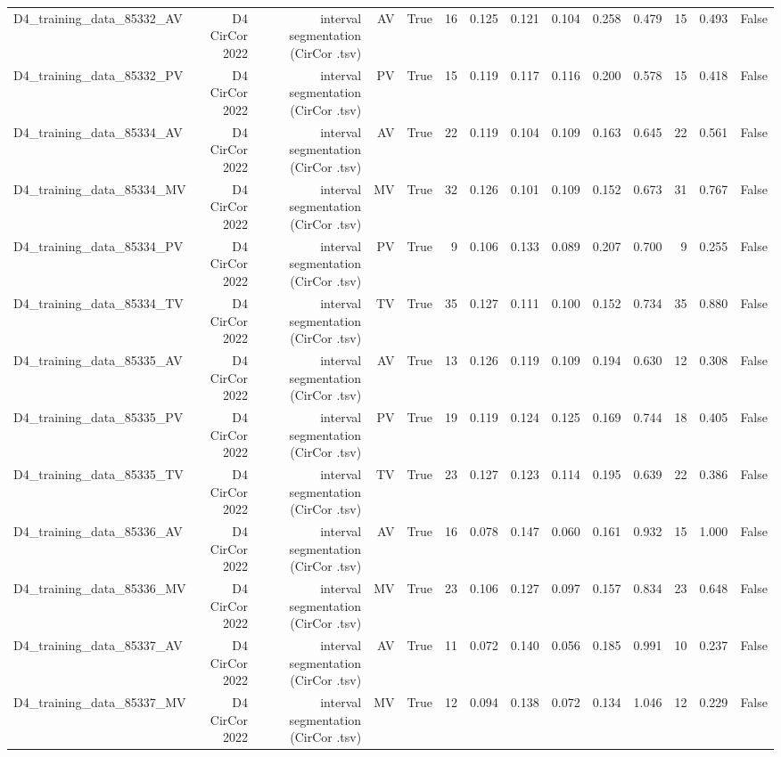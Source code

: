 \begin{table}[htbp]
\begin{tabular}{lrrrrrrrrrrrrr}
    D4\_training\_data\_85332\_AV & D4 CirCor 2022 & interval segmentation (CirCor .tsv) & AV & True & 16 & 0.125 & 0.121 & 0.104 & 0.258 & 0.479 & 15 & 0.493 & False \\
    D4\_training\_data\_85332\_PV & D4 CirCor 2022 & interval segmentation (CirCor .tsv) & PV & True & 15 & 0.119 & 0.117 & 0.116 & 0.200 & 0.578 & 15 & 0.418 & False \\
    D4\_training\_data\_85334\_AV & D4 CirCor 2022 & interval segmentation (CirCor .tsv) & AV & True & 22 & 0.119 & 0.104 & 0.109 & 0.163 & 0.645 & 22 & 0.561 & False \\
    D4\_training\_data\_85334\_MV & D4 CirCor 2022 & interval segmentation (CirCor .tsv) & MV & True & 32 & 0.126 & 0.101 & 0.109 & 0.152 & 0.673 & 31 & 0.767 & False \\
    D4\_training\_data\_85334\_PV & D4 CirCor 2022 & interval segmentation (CirCor .tsv) & PV & True & 9 & 0.106 & 0.133 & 0.089 & 0.207 & 0.700 & 9 & 0.255 & False \\
    D4\_training\_data\_85334\_TV & D4 CirCor 2022 & interval segmentation (CirCor .tsv) & TV & True & 35 & 0.127 & 0.111 & 0.100 & 0.152 & 0.734 & 35 & 0.880 & False \\
    D4\_training\_data\_85335\_AV & D4 CirCor 2022 & interval segmentation (CirCor .tsv) & AV & True & 13 & 0.126 & 0.119 & 0.109 & 0.194 & 0.630 & 12 & 0.308 & False \\
    D4\_training\_data\_85335\_PV & D4 CirCor 2022 & interval segmentation (CirCor .tsv) & PV & True & 19 & 0.119 & 0.124 & 0.125 & 0.169 & 0.744 & 18 & 0.405 & False \\
    D4\_training\_data\_85335\_TV & D4 CirCor 2022 & interval segmentation (CirCor .tsv) & TV & True & 23 & 0.127 & 0.123 & 0.114 & 0.195 & 0.639 & 22 & 0.386 & False \\
    D4\_training\_data\_85336\_AV & D4 CirCor 2022 & interval segmentation (CirCor .tsv) & AV & True & 16 & 0.078 & 0.147 & 0.060 & 0.161 & 0.932 & 15 & 1.000 & False \\
    D4\_training\_data\_85336\_MV & D4 CirCor 2022 & interval segmentation (CirCor .tsv) & MV & True & 23 & 0.106 & 0.127 & 0.097 & 0.157 & 0.834 & 23 & 0.648 & False \\
    D4\_training\_data\_85337\_AV & D4 CirCor 2022 & interval segmentation (CirCor .tsv) & AV & True & 11 & 0.072 & 0.140 & 0.056 & 0.185 & 0.991 & 10 & 0.237 & False \\
    D4\_training\_data\_85337\_MV & D4 CirCor 2022 & interval segmentation (CirCor .tsv) & MV & True & 12 & 0.094 & 0.138 & 0.072 & 0.134 & 1.046 & 12 & 0.229 & False \\

\end{tabular}
\end{table}
